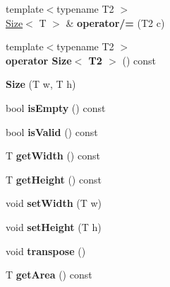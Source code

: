 \begin{DoxyCompactItemize}
\item 
\hypertarget{class_size_ae23ef0c1e3fc6bd7054d6553fb6e8a00}{
{\footnotesize template$<$typename T2 $>$ }\\\hyperlink{class_size}{Size}$<$ T $>$ \& {\bfseries operator/=} (T2 c)}
\label{class_size_ae23ef0c1e3fc6bd7054d6553fb6e8a00}

\item 
\hypertarget{class_size_ae7c404e21e544f5e95a194a03c84f251}{
{\footnotesize template$<$typename T2 $>$ }\\{\bfseries operator Size$<$ T2 $>$} () const }
\label{class_size_ae7c404e21e544f5e95a194a03c84f251}

\item 
\hypertarget{class_size_af1c5ad71aa40371fa62aa71ee81c3dde}{
{\bfseries Size} (T w, T h)}
\label{class_size_af1c5ad71aa40371fa62aa71ee81c3dde}

\item 
\hypertarget{class_size_a2feb6af7868053ec23b4eea7f2cc64dd}{
bool {\bfseries isEmpty} () const }
\label{class_size_a2feb6af7868053ec23b4eea7f2cc64dd}

\item 
\hypertarget{class_size_a72f90a2c7648b173a81d1535c45e1168}{
bool {\bfseries isValid} () const }
\label{class_size_a72f90a2c7648b173a81d1535c45e1168}

\item 
\hypertarget{class_size_a8f02c9a3825f72db52762c8c6dbac9f9}{
T {\bfseries getWidth} () const }
\label{class_size_a8f02c9a3825f72db52762c8c6dbac9f9}

\item 
\hypertarget{class_size_aaca336454ac27a1359a7f815da660ab4}{
T {\bfseries getHeight} () const }
\label{class_size_aaca336454ac27a1359a7f815da660ab4}

\item 
\hypertarget{class_size_a121262181e42aa1ca35b87eb072230fc}{
void {\bfseries setWidth} (T w)}
\label{class_size_a121262181e42aa1ca35b87eb072230fc}

\item 
\hypertarget{class_size_a31c905c24fc46fd7fb0ead3b27c883bf}{
void {\bfseries setHeight} (T h)}
\label{class_size_a31c905c24fc46fd7fb0ead3b27c883bf}

\item 
\hypertarget{class_size_ad4fe5e5347033c30961bf0bb68e2f2db}{
void {\bfseries transpose} ()}
\label{class_size_ad4fe5e5347033c30961bf0bb68e2f2db}

\item 
\hypertarget{class_size_adb5d429e93a45a4711a34a1b1b5d979f}{
T {\bfseries getArea} () const }
\label{class_size_adb5d429e93a45a4711a34a1b1b5d979f}


\end{DoxyCompactItemize}
